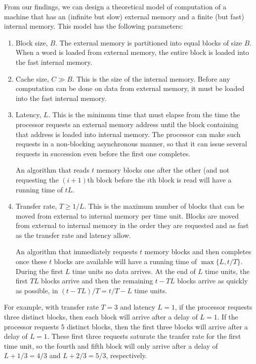 \documentclass{patmorin}
\begin{document}
From our findings, we can design a theoretical model of computation of
a machine that has an (infinite but slow) external memory and a finite
(but fast) internal memory.  This model has the following parameters:

\begin{enumerate}

  \item Block size, $B$. The external memory is partitioned into equal
    blocks of size $B$. When a word is loaded from external memory,
    the entire block is loaded into the fast internal memory.

  \item Cache size, $C \gg B$.  This is the size of the internal
    memory. Before any computation can be done on data from external
    memory, it must be loaded into the fast internal memory.

  \item Latency, $L$. This is the minimum time that must elapse from the
    time the processor requests an external memory address until the block
    containing that address is loaded into internal memory.  The processor
    can make such requests in a non-blocking asynchronous manner, so that
    it can issue several requests in succession even before the first one
    completes.

    An algorithm that reads $t$ memory blocks one after the other (and
    not requesting the $(i+1)$th block before the $i$th block is read
    will have a running time of $tL$.

  \item Transfer rate, $T \ge 1/L$.  This is the maximum number of
    blocks that can be moved from external to internal memory per time
    unit.  Blocks are moved from external to internal memory in the order
    they are requested and as fast as the transfer rate and latency allow.

    An algorithm that immediately requests $t$ memory blocks and then
    completes once these $t$ blocks are available will have a running
    time of $\max\{L,t/T\}$.  During the first $L$ time units no data
    arrives. At the end of $L$ time units, the first $TL$ blocks arrive
    and then the remaining $t-TL$ blocks arrive as quickly as possible,
    in $(t-TL)/T=t/T -L$ time units.

\end{enumerate}

For example, with transfer rate $T=3$ and latency $L=1$, if the processor
requests three distinct blocks, then each block will arrive after a
delay of $L=1$.  If the processor requests 5 distinct blocks, then
the first three blocks will arrive after a delay of $L=1$. These first
three requests saturate the tranfer rate for the first time unit, so
the fourth and fifth block will only arrive after a delay of $L+1/3=4/3$
and $L+2/3=5/3$, respectively.
\end{document}
